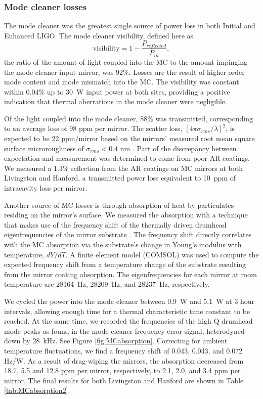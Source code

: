 \subsubsection{Mode cleaner losses} 
The mode cleaner was the greatest single source of power loss in both
Initial and Enhanced LIGO. The mode cleaner visibility, defined here as
\begin{equation}
\mbox{visibility} = 1 - \frac{P_{reflected}}{P_{in}},
\end{equation}
the ratio of the amount of light coupled into the MC to the amount
impinging the mode cleaner input mirror, was 92\%. Losses are the result of higher
order mode content and mode mismatch into the MC. The visibility was
constant within 0.04\% up to 30~W input power at both sites, providing a positive
indication that thermal aberrations in the mode cleaner were
negligible. 

Of the light coupled into the mode cleaner, 88\% was transmitted,
corresponding to an average loss of 98 ppm per mirror. 
The scatter loss, $[4 \pi \sigma_{rms} / \lambda]^2$,
is expected to be 22 ppm/mirror based on the
mirrors' measured root mean square surface microroughness of $\sigma_{rms}< 0.4$
nm \cite{1998Component}. Part of the discrepancy between expectation and
measurement was determined to come from poor AR coatings. We measured
a 1.3\% reflection from the AR coatings on MC mirrors at both
Livingston and Hanford, a transmitted power loss equivalent to 10~ppm
of intracavity loss per mirror.

Another source of MC losses is through absorption of heat by
particulates residing on the mirror's surface. We measured the
absorption with a technique that makes use of the frequency shift of
the thermally driven drumhead eigenfrequencies of the mirror substrate
\citep{Punturo2007Mirror}. The frequency shift directly correlates with
the MC absorption via the substrate's change in Young's modulus with
temperature, $dY/dT$. A finite element model (COMSOL) was used to
compute the expected frequency shift from a temperature change of the
substrate resulting from the mirror coating absorption. The
eigenfrequencies for each mirror at room temperature are 28164~Hz,
28209~Hz, and 28237~Hz, respectively.

We cycled the power into the mode cleaner between 0.9~W and 5.1~W at 3
hour intervals, allowing enough time for a thermal characteristic time
constant to be reached.  At the same time, we recorded the frequencies
of the high Q drumhead mode peaks as found in the mode cleaner
frequency error signal, heterodyned down by 28~kHz. See Figure
\ref{fig:MCabsorption}. Correcting for ambient temperature
fluctuations, we find a frequency shift of 0.043, 0.043, and 0.072
Hz/W. As a result of drag-wiping the mirrors, the absorption decreased
from 18.7, 5.5 and 12.8 ppm per mirror, respectively, to 2.1, 2.0, and
3.4 ppm per mirror. The final results for both Livingston and Hanford
are shown in Table \ref{tab:MCabsorption2}.

